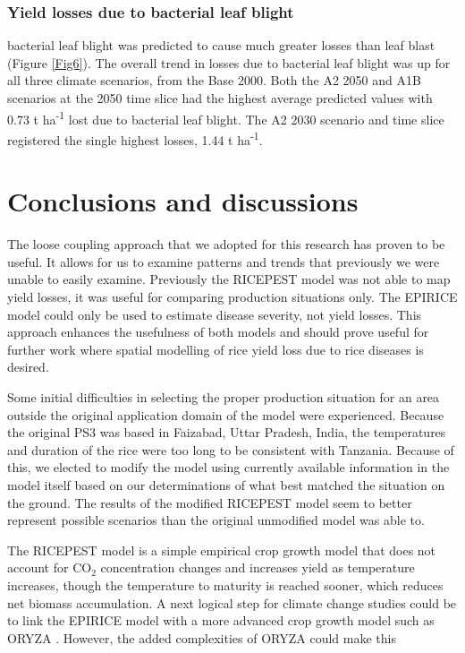     \subsubsection{Yield losses due to bacterial leaf blight}
    \label{bb_yield_losses}
    bacterial leaf blight was predicted to cause much greater losses than leaf blast (Figure \ref{Fig6}). The overall trend in losses due to bacterial leaf blight was up for all three climate scenarios, from the Base 2000. Both the A2 2050 and A1B scenarios at the 2050 time slice had the highest average predicted values with 0.73 t ha\textsuperscript{-1} lost due to bacterial leaf blight. The A2 2030 scenario and time slice registered the single highest losses, 1.44 t ha\textsuperscript{-1}.
        
    \section{Conclusions and discussions}
    \label{conclusions}
    The loose coupling approach that we adopted for this research has proven to be useful. It allows for us to examine patterns and trends that previously we were unable to easily examine. Previously the RICEPEST model was not able to map yield losses, it was useful for comparing production situations only. The EPIRICE model could only be used to estimate disease severity, not yield losses. This approach enhances the usefulness of both models and should prove useful for further work where spatial modelling of rice yield loss due to rice diseases is desired.
    
    Some initial difficulties in selecting the proper production situation for an area outside the original application domain of the model were experienced. Because the original PS3 was based in Faizabad, Uttar Pradesh, India, the temperatures and duration of the rice were too long to be consistent with Tanzania. Because of this, we elected to modify the model using currently available information in the model itself based on our determinations of what best matched the situation on the ground. The results of the modified RICEPEST model seem to better represent possible scenarios than the original unmodified model was able to.
    
    The RICEPEST model is a simple empirical crop growth model that does not account for CO$_2$ concentration changes and increases yield as temperature increases, though the temperature to maturity is reached sooner, which reduces net biomass accumulation. A next logical step for climate change studies could be to link the EPIRICE model with a more advanced crop growth model such as ORYZA \citep{Oryza}. However, the added complexities of ORYZA could make this 
    
